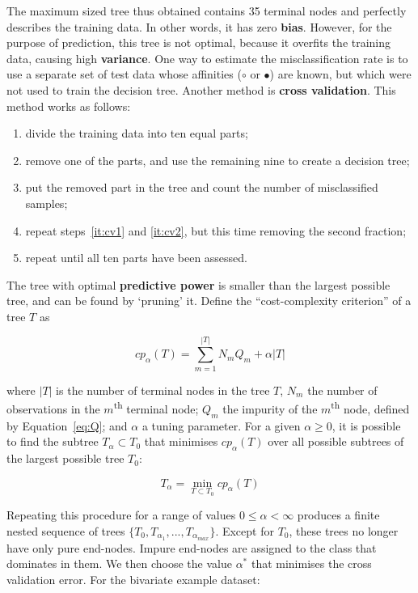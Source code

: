The maximum sized tree thus obtained contains 35 terminal nodes and
perfectly describes the training data.  In other words, it has zero
\textbf{bias}.  However, for the purpose of prediction, this tree is
not optimal, because it overfits the training data, causing high
\textbf{variance}. One way to estimate the misclassification rate is
to use a separate set of test data whose affinities ($\circ$ or
$\bullet$) are known, but which were not used to train the decision
tree. Another method is \textbf{cross validation}. This method works
as follows:

\begin{enumerate}
\item divide the training data into ten equal parts;
\item\label{it:cv1} remove one of the parts, and use the remaining
  nine to create a decision tree;
\item\label{it:cv2} put the removed part in the tree and count the
  number of misclassified samples;
\item repeat steps~\ref{it:cv1} and \ref{it:cv2}, but this time
  removing the second fraction;
\item repeat until all ten parts have been assessed.
\end{enumerate}

The tree with optimal \textbf{predictive power} is smaller than the
largest possible tree, and can be found by `pruning' it. Define the
``cost-complexity criterion'' of a tree $T$ as

\begin{equation}
  \label{eq:cp}
  cp_{\alpha}(T) = \sum_{m=1}^{|T|} N_m Q_m + \alpha|T|
\end{equation}

\noindent where $|T|$ is the number of terminal nodes in the tree $T$,
$N_m$ the number of observations in the $m$\textsuperscript{th}
terminal node; $Q_m$ the impurity of the $m$\textsuperscript{th} node,
defined by Equation~\ref{eq:Q}; and $\alpha$ a tuning parameter.  For
a given $\alpha \geq 0$, it is possible to find the subtree
$T_{\alpha} \subset T_0$ that minimises $cp_{\alpha}(T)$ over all
possible subtrees of the largest possible tree $T_0$:

\begin{equation}
  \label{eq:Ta}
  T_{\alpha} = \underset{T \subset T_0}{\min} cp_{\alpha}(T)
\end{equation}

Repeating this procedure for a range of values $0 \leq \alpha <
\infty$ produces a finite nested sequence of trees
$\{T_0,T_{\alpha_1},...,T_{\alpha_{max}}\}$.  Except for $T_0$, these
trees no longer have only pure end-nodes. Impure end-nodes are
assigned to the class that dominates in them.  We then choose the
value $\alpha^*$ that minimises the cross validation error. For the
bivariate example dataset:

